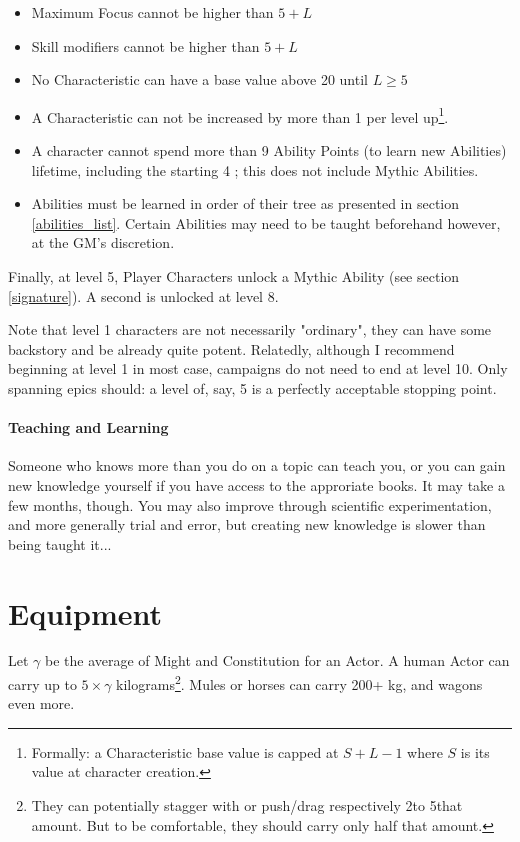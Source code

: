\begin{itemize}
	\item Maximum Focus cannot be higher than $5+L$
	\item Skill modifiers cannot be higher than $5+L$
	\item No Characteristic can have a base value above 20 until $L \geq 5$
	\item A Characteristic can not be increased by more than 1 per level up\footnote{Formally: a Characteristic base value is capped at $S + L - 1$ where $S$ is its value at character creation.}.
	\item A character cannot spend more than 9 Ability Points (to learn new Abilities) lifetime, including the starting 4 ; this does not include Mythic Abilities.
	\item Abilities must be learned in order of their tree as presented in section \ref{abilities_list}. Certain Abilities may need to be taught beforehand however, at the GM's discretion.
\end{itemize}


Finally, at level 5, Player Characters unlock a Mythic Ability (see section \ref{signature}). A second is unlocked at level 8. 

Note that level 1 characters are not necessarily "ordinary", they can have some backstory and be already quite potent. Relatedly, although I recommend beginning at level 1 in most case, campaigns do not need to end at level 10. Only spanning epics should: a level of, say, 5 is a perfectly acceptable stopping point.

\paragraph{Teaching and Learning}

Someone who knows more than you do on a topic can teach you, or you can gain new knowledge yourself if you have access to the approriate books. It may take a few months, though. You may also improve through scientific experimentation, and more generally trial and error, but creating new knowledge is slower than being taught it...


\section{Equipment}

\label{equipment}

Let $\gamma$ be the average of Might and Constitution for an Actor. A human Actor can carry up to $5 \times \gamma$ kilograms\footnote{They can potentially stagger with or push/drag respectively 2\texttimes to 5\texttimes that amount. But to be comfortable, they should carry only half that amount.}. Mules or horses can carry 200+ kg, and wagons even more.

